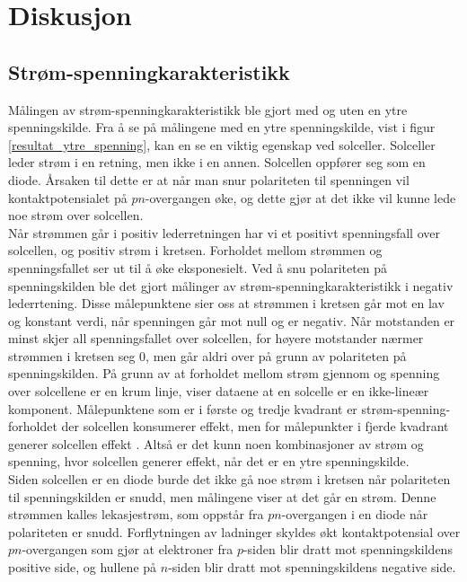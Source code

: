 \documentclass[%
 reprint,
 amsmath,amssymb,
 aps,
 norsk,
 booktabs
]{revtex4-1}
\begin{document}
\section{Diskusjon}
\subsection{Strøm-spenningkarakteristikk}
Målingen av strøm-spenningkarakteristikk ble gjort med og uten en ytre spenningskilde. Fra å se på målingene med en ytre spenningskilde, vist i figur \vref{resultat_ytre_spenning}, kan en se en viktig egenskap ved solceller. Solceller leder strøm i en retning, men ikke i en annen. Solcellen oppfører seg som en diode. Årsaken til dette er at når man snur polariteten til spenningen vil kontaktpotensialet på $pn$-overgangen øke, og dette gjør at det ikke vil kunne lede noe strøm over solcellen.\\Når strømmen går i positiv lederretningen har vi et positivt spenningsfall over solcellen, og positiv strøm i kretsen. Forholdet mellom strømmen og spenningsfallet ser ut til å øke eksponesielt. Ved å snu polariteten på spenningskilden ble det gjort målinger av strøm-spenningkarakteristikk i negativ lederrtening. Disse målepunktene sier oss at strømmen i kretsen går mot en lav og konstant verdi, når spenningen går mot null og er negativ. Når motstanden er minst skjer all spenningsfallet over solcellen, for høyere motstander nærmer strømmen i kretsen seg $0$, men går aldri over på grunn av polariteten på spenningskilden. På grunn av at forholdet mellom strøm gjennom og spenning over solcellene er en krum linje, viser dataene at en solcelle er en ikke-lineær komponent. Målepunktene som er i første og tredje kvadrant er strøm-spenning-forholdet der solcellen konsumerer effekt, men for målepunkter i fjerde kvadrant generer solcellen effekt \cite{torbj}. Altså er det kunn noen kombinasjoner av strøm og spenning, hvor solcellen generer effekt, når det er en ytre spenningskilde. \\Siden solcellen er en diode burde det ikke gå noe strøm i kretsen når polariteten til spenningskilden er snudd, men målingene viser at det går en strøm. Denne strømmen kalles lekasjestrøm, som oppstår fra $pn$-overgangen i en diode når polariteten er snudd. Forflytningen av ladninger skyldes økt kontaktpotensial over $pn$-overgangen som gjør at elektroner fra $p$-siden blir dratt mot spenningskildens positive side, og hullene på $n$-siden blir dratt mot spenningskildens negative side. \cite{wiki2} \par
\end{document}
